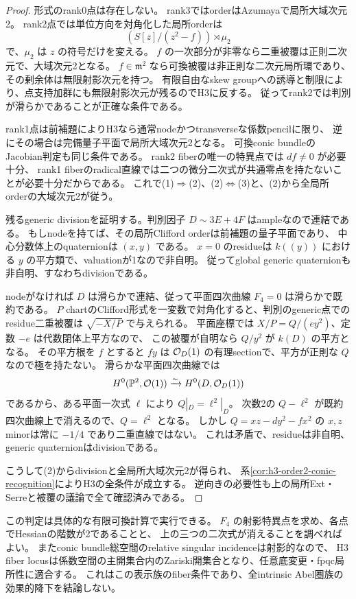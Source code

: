\begin{proof}
形式のrank0点は存在しない。
rank3ではorderはAzumayaで局所大域次元2。
rank2点では単位方向を対角化した局所orderは
\[
 (S[z]/(z^2-f))\rtimes\mu_2
\]
で、$\mu_2$ は $z$ の符号だけを変える。
$f$ の一次部分が非零なら二重被覆は正則二次元で、大域次元2となる。
$f\in\mathfrak m^2$ なら可換被覆は非正則な二次元局所環であり、
その剰余体は無限射影次元を持つ。
有限自由なskew groupへの誘導と制限により、点支持加群にも無限射影次元が残るのでH3に反する。
従ってrank2では判別が滑らかであることが正確な条件である。

rank1点は前補題によりH3なら通常nodeかつtransverseな係数pencilに限り、
逆にその場合は完備量子平面で局所大域次元2となる。
可換conic bundleのJacobian判定も同じ条件である。
rank2 fiberの唯一の特異点では $df\ne0$ が必要十分、
rank1 fiberのradical直線では二つの微分二次式が共通零点を持たないことが必要十分だからである。
これで(1)$\Rightarrow$(2)、(2)$\Leftrightarrow$(3)と、(2)から全局所orderの大域次元2が従う。

残るgeneric divisionを証明する。判別因子 $D\sim3E+4F$ はampleなので連結である。
もしnodeを持てば、その局所Clifford orderは前補題の量子平面であり、
中心分数体上のquaternionは $(x,y)$ である。
$x=0$ のresidueは $k((y))$ における $y$ の平方類で、valuationが1なので非自明。
従ってglobal generic quaternionも非自明、すなわちdivisionである。

nodeがなければ $D$ は滑らかで連結、従って平面四次曲線 $F_4=0$ は滑らかで既約である。
$P$ chartのClifford形式を一変数で対角化すると、判別のgeneric点でのresidue二重被覆は
$\sqrt{-X/P}$ で与えられる。
平面座標では $X/P=Q/(ey^2)$、定数 $-e$ は代数閉体上平方なので、
この被覆が自明なら $Q/y^2$ が $k(D)$ の平方となる。
その平方根を $f$ とすると $fy$ は $\mathcal O_D(1)$ の有理sectionで、平方が正則な $Q$ なので極を持たない。
滑らかな平面四次曲線では
\[
 H^0(\mathbb P^2,\mathcal O(1))\xrightarrow{\sim}H^0(D,\mathcal O_D(1))
\]
であるから、ある平面一次式 $\ell$ により $Q|_D=\ell^2|_D$。
次数2の $Q-\ell^2$ が既約四次曲線上で消えるので、$Q=\ell^2$ となる。
しかし $Q=xz-dy^2-fx^2$ の $x,z$ minorは常に $-1/4$ であり二重直線ではない。
これは矛盾で、residueは非自明、generic quaternionはdivisionである。

こうして(2)からdivisionと全局所大域次元2が得られ、
系\ref{cor:h3-order2-conic-recognition}によりH3の全条件が成立する。
逆向きの必要性も上の局所Ext・Serreと被覆の議論で全て確認済みである。
\end{proof}

この判定は具体的な有限可換計算で実行できる。
$F_4$ の射影特異点を求め、各点でHessianの階数が2であることと、
上の三つの二次式が消えることを調べればよい。
またconic bundle総空間のrelative singular incidenceは射影的なので、
H3 fiber locusは係数空間の主開集合内のZariski開集合となり、任意底変更・fpqc局所性に適合する。
これはこの表示族のfiber条件であり、全intrinsic Abel圏族の効果的降下を結論しない。

